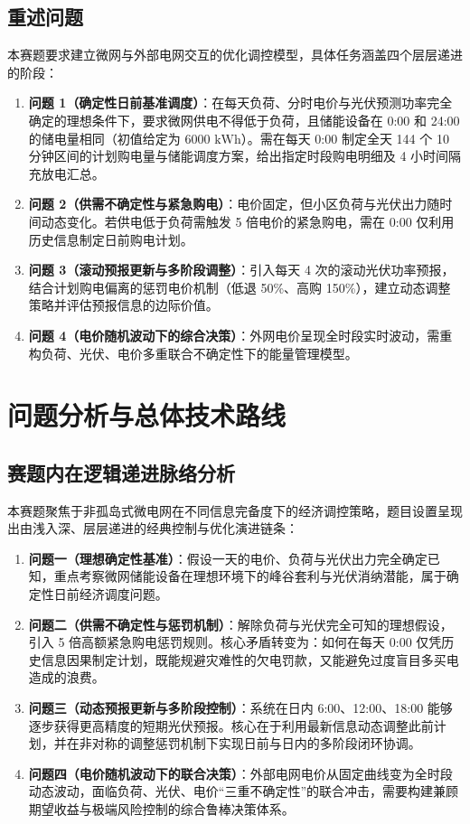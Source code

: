 \documentclass[withoutpreface]{cumcmthesis}
\begin{document}
\subsection{重述问题}
本赛题要求建立微网与外部电网交互的优化调控模型，具体任务涵盖四个层层递进的阶段：
\begin{enumerate}
    \item \textbf{问题 1（确定性日前基准调度）}：在每天负荷、分时电价与光伏预测功率完全确定的理想条件下，要求微网供电不得低于负荷，且储能设备在 0:00 和 24:00 的储电量相同（初值给定为 $6000\text{ kWh}$）。需在每天 0:00 制定全天 144 个 10 分钟区间的计划购电量与储能调度方案，给出指定时段购电明细及 4 小时间隔充放电汇总。
    \item \textbf{问题 2（供需不确定性与紧急购电）}：电价固定，但小区负荷与光伏出力随时间动态变化。若供电低于负荷需触发 5 倍电价的紧急购电，需在 0:00 仅利用历史信息制定日前购电计划。
    \item \textbf{问题 3（滚动预报更新与多阶段调整）}：引入每天 4 次的滚动光伏功率预报，结合计划购电偏离的惩罚电价机制（低退 50\%、高购 150\%），建立动态调整策略并评估预报信息的边际价值。
    \item \textbf{问题 4（电价随机波动下的综合决策）}：外网电价呈现全时段实时波动，需重构负荷、光伏、电价多重联合不确定性下的能量管理模型。
\end{enumerate}


\section{问题分析与总体技术路线}

\subsection{赛题内在逻辑递进脉络分析}
本赛题聚焦于非孤岛式微电网在不同信息完备度下的经济调控策略，题目设置呈现出由浅入深、层层递进的经典控制与优化演进链条：
\begin{enumerate}
    \item \textbf{问题一（理想确定性基准）}：假设一天的电价、负荷与光伏出力完全确定已知，重点考察微网储能设备在理想环境下的峰谷套利与光伏消纳潜能，属于确定性日前经济调度问题。
    \item \textbf{问题二（供需不确定性与惩罚机制）}：解除负荷与光伏完全可知的理想假设，引入 5 倍高额紧急购电惩罚规则。核心矛盾转变为：如何在每天 0:00 仅凭历史信息因果制定计划，既能规避灾难性的欠电罚款，又能避免过度盲目多买电造成的浪费。
    \item \textbf{问题三（动态预报更新与多阶段控制）}：系统在日内 6:00、12:00、18:00 能够逐步获得更高精度的短期光伏预报。核心在于利用最新信息动态调整此前计划，并在非对称的调整惩罚机制下实现日前与日内的多阶段闭环协调。
    \item \textbf{问题四（电价随机波动下的联合决策）}：外部电网电价从固定曲线变为全时段动态波动，面临负荷、光伏、电价“三重不确定性”的联合冲击，需要构建兼顾期望收益与极端风险控制的综合鲁棒决策体系。
\end{enumerate}
\end{document}

